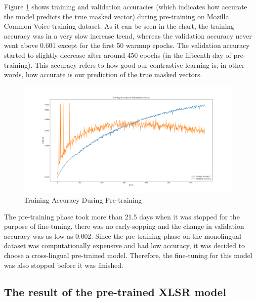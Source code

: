 \documentclass[
  a4paper,
]{article}
\begin{document}
Figure \ref{fig:training_accuracy} shows training and validation
accuracies (which indicates how accurate the model predicts the true
masked vector) during pre-training on Mozilla Common Voice training
dataset. As it can be seen in the chart, the training accuracy was in a
very slow increase trend, whereas the validation accuracy never went
above 0.601 except for the first 50 warmup epochs. The validation
accuracy started to slightly decrease after around 450 epochs (in the
fifteenth day of pre-training). This accuracy refers to how good our
contrastive learning is, in other words, how accurate is our prediction
of the true masked vectors.

\begin{figure}

{\centering \includegraphics{train_valid_accuracy} 

}

\caption{Training Accuracy During Pre-training}\label{fig:training_accuracy}
\end{figure}

The pre-training phase took more than 21.5 days when it was stopped for
the purpose of fine-tuning, there was no early-sopping and the change in
validation accuracy was as low as 0.002. Since the pre-training phase on
the monolingual dataset was computationally expensive and had low
accuracy, it was decided to choose a cross-lingual pre-trained model.
Therefore, the fine-tuning for this model was also stopped before it was
finished.

\hypertarget{the-result-of-the-pre-trained-xlsr-model}{%
\subsection{The result of the pre-trained XLSR
model}\label{the-result-of-the-pre-trained-xlsr-model}}
\end{document}
